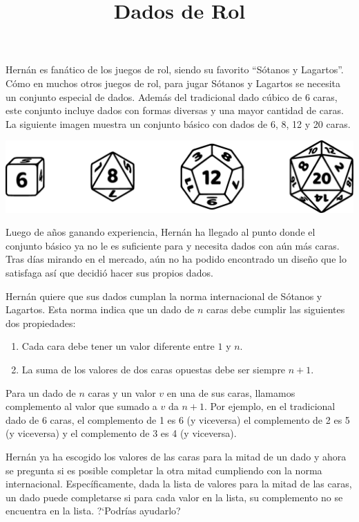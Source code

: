 \documentclass{oci}
\title{Dados de Rol}
\begin{document}
\begin{problemDescription}
  Hernán es fanático de los juegos de rol, siendo su favorito ``Sótanos y Lagartos''.
  Cómo en muchos otros juegos de rol, para jugar Sótanos y Lagartos se
  necesita un conjunto especial de dados.
  Además del tradicional dado cúbico de 6 caras, este conjunto incluye dados
  con formas diversas y una mayor cantidad de caras.
  La siguiente imagen muestra un conjunto básico con
  dados de 6, 8, 12 y 20 caras.
  \begin{center}
    \includegraphics[scale=0.2]{horizontal-sin4}
  \end{center}

  Luego de años ganando experiencia, Hernán ha llegado al
  punto donde el conjunto básico ya no le es suficiente para
  y necesita dados con aún más caras.
  Tras días mirando en el mercado, aún no ha podido encontrado
  un diseño que lo satisfaga así que decidió hacer sus propios
  dados.

  Hernán quiere que sus dados cumplan la norma internacional
  de Sótanos y Lagartos.
  Esta norma indica que un dado de $n$ caras debe cumplir las
  siguientes dos propiedades:
  \begin{enumerate}
    \item Cada cara debe tener un valor diferente entre $1$ y $n$.
    \item La suma de los valores de dos caras opuestas debe ser siempre $n+1$.
  \end{enumerate}
  Para un dado de $n$ caras y un valor $v$ en una de sus caras, llamamos
  complemento al valor que sumado a $v$ da $n+1$.
  Por ejemplo, en el tradicional dado de 6 caras, el complemento de 1 es 6 (y viceversa)
  el complemento de 2 es 5 (y viceversa) y el complemento de 3 es 4 (y viceversa).

  Hernán ya ha escogido los valores de las caras para la mitad de un dado y
  ahora se pregunta si es posible completar la otra mitad cumpliendo con la norma
  internacional.
  Específicamente, dada la lista de valores para la mitad de las caras, un
  dado puede completarse si para cada valor en la lista, su complemento no se
  encuentra en la lista.
  ?`Podrías ayudarlo?
\end{problemDescription}
\end{document}
